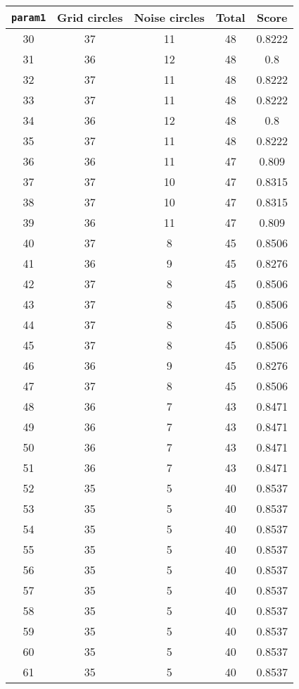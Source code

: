 \documentclass[letterpaper, 12pt]{article}
\begin{document}
\begin{longtable}{|c|c|c|c|c|}
\hline
\textbf{\texttt{param1}} & \textbf{Grid circles} & \textbf{Noise circles} & \textbf{Total} & \textbf{Score} \\
\hline
30 & 37 & 11 & 48 & 0.8222 \\
\hline
31 & 36 & 12 & 48 & 0.8 \\
\hline
32 & 37 & 11 & 48 & 0.8222 \\
\hline
33 & 37 & 11 & 48 & 0.8222 \\
\hline
34 & 36 & 12 & 48 & 0.8 \\
\hline
35 & 37 & 11 & 48 & 0.8222 \\
\hline
36 & 36 & 11 & 47 & 0.809 \\
\hline
37 & 37 & 10 & 47 & 0.8315 \\
\hline
38 & 37 & 10 & 47 & 0.8315 \\
\hline
39 & 36 & 11 & 47 & 0.809 \\
\hline
40 & 37 & 8 & 45 & 0.8506 \\
\hline
41 & 36 & 9 & 45 & 0.8276 \\
\hline
42 & 37 & 8 & 45 & 0.8506 \\
\hline
43 & 37 & 8 & 45 & 0.8506 \\
\hline
44 & 37 & 8 & 45 & 0.8506 \\
\hline
45 & 37 & 8 & 45 & 0.8506 \\
\hline
46 & 36 & 9 & 45 & 0.8276 \\
\hline
47 & 37 & 8 & 45 & 0.8506 \\
\hline
48 & 36 & 7 & 43 & 0.8471 \\
\hline
49 & 36 & 7 & 43 & 0.8471 \\
\hline
50 & 36 & 7 & 43 & 0.8471 \\
\hline
51 & 36 & 7 & 43 & 0.8471 \\
\hline
52 & 35 & 5 & 40 & 0.8537 \\
\hline
53 & 35 & 5 & 40 & 0.8537 \\
\hline
54 & 35 & 5 & 40 & 0.8537 \\
\hline
55 & 35 & 5 & 40 & 0.8537 \\
\hline
56 & 35 & 5 & 40 & 0.8537 \\
\hline
57 & 35 & 5 & 40 & 0.8537 \\
\hline
58 & 35 & 5 & 40 & 0.8537 \\
\hline
59 & 35 & 5 & 40 & 0.8537 \\
\hline
60 & 35 & 5 & 40 & 0.8537 \\
\hline
61 & 35 & 5 & 40 & 0.8537 \\

\end{longtable}
\end{document}
